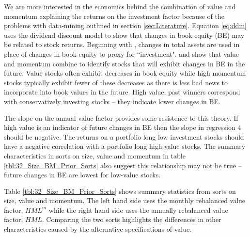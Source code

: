 We are more interested in the economics behind the combination of value and momentum
explaining the returns on the investment factor because of the problems with data-mining
outlined in section \ref{sec:Literature}. Equation \ref{eq:ddm} uses the dividend discount
model to show that changes in book equity (BE) may be related to stock returns. Beginning
with \textcite{fama2006profitability}, changes in total assets are used in place of
changes in book equity to proxy for ``investment". \textcite{kok2017facts} and
\textcite{asness2013devil} show that value and momentum combine to identify stocks that
will exhibit changes in BE in the future. Value stocks often exhibit decreases in book
equity while high momentum stocks typically exhibit fewer of these decreases as there is
less bad news to incorporate into book values in the future. High value, past winners
correspond with conservatively investing stocks -- they indicate lower changes in BE.

The slope on the annual value factor provides some resistence to this theory. If high
value is an indicator of future changes in BE then the slope in regression 4 should be
negative. The returns on a portfolio long low investment stocks should have a negative
correlation with a portfolio long high value stocks. The summary characteristics in sorts
on size, value and momentum in table \ref{tbl:32_Size_BM_Prior_Sorts} also suggest this
relationship may not be true -- future changes in BE are lowest for low-value stocks.

\restoregeometry

Table \ref{tbl:32_Size_BM_Prior_Sorts} shows summary statistics from sorts on size, value
and momentum. The left hand side uses the monthly rebalanced value factor, $HML^m$ while
the right hand side uses the annually rebalanced value factor, $HML$. Comparing the two
sorts highlights the differences in other characteristics caused by the alternative
specifications of value.

